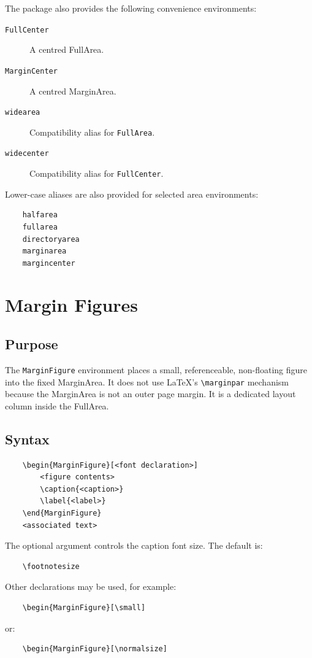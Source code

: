 \documentclass[
11pt,
a4paper,
oneside
]{scrbook}
\begin{document}
The package also provides the following convenience environments:
\begin{description}
	\item[\texttt{FullCenter}]
	A centred FullArea.
	
	\item[\texttt{MarginCenter}]
	A centred MarginArea.
	
	\item[\texttt{widearea}]
	Compatibility alias for \texttt{FullArea}.
	
	\item[\texttt{widecenter}]
	Compatibility alias for \texttt{FullCenter}.
\end{description}
Lower-case aliases are also provided for selected area environments:
\begin{verbatim}
	halfarea
	fullarea
	directoryarea
	marginarea
	margincenter
\end{verbatim}



\chapter{Margin Figures}
\label{chap:margin-figures}

\section{Purpose}

The \texttt{MarginFigure} environment places a small, referenceable,
non-floating figure into the fixed MarginArea.
It does not use LaTeX's \verb|\marginpar| mechanism because the MarginArea is
not an outer page margin.
It is a dedicated layout column inside the FullArea.

\section{Syntax}

\begin{verbatim}
	\begin{MarginFigure}[<font declaration>]
		<figure contents>
		\caption{<caption>}
		\label{<label>}
	\end{MarginFigure}
	<associated text>
\end{verbatim}
The optional argument controls the caption font size.
The default is:
\begin{verbatim}
	\footnotesize
\end{verbatim}
Other declarations may be used, for example:
\begin{verbatim}
	\begin{MarginFigure}[\small]
\end{verbatim}
	or:
\begin{verbatim}
	\begin{MarginFigure}[\normalsize]
\end{verbatim}
	
\end{document}
